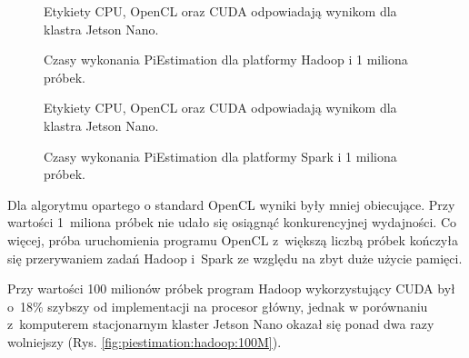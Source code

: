 \begin{figure}[h]
    \centering
    \caption{Czasy wykonania PiEstimation dla platformy Hadoop i 1 miliona próbek.}
    \medskip \small
    Etykiety CPU, OpenCL oraz CUDA odpowiadają wynikom dla klastra Jetson Nano.
    \label{fig:piestimation:hadoop:1M}
\end{figure}

\begin{figure}[h!]
    \centering
    \caption{Czasy wykonania PiEstimation dla platformy Spark i 1 miliona próbek.}
    \medskip \small
    Etykiety CPU, OpenCL oraz CUDA odpowiadają wynikom dla klastra Jetson Nano.
    \label{fig:piestimation:spark:1M}
\end{figure}

Dla algorytmu opartego o standard OpenCL wyniki były mniej obiecujące. Przy wartości 1~miliona próbek
nie udało się osiągnąć konkurencyjnej wydajności. Co więcej, próba uruchomienia programu OpenCL z~większą
liczbą próbek kończyła się przerywaniem zadań Hadoop i~Spark ze względu na zbyt duże użycie pamięci.
\newpage

Przy wartości 100 milionów próbek program Hadoop wykorzystujący CUDA był o~18\% szybszy od implementacji
na procesor główny, jednak w porównaniu z~komputerem stacjonarnym klaster Jetson Nano okazał się ponad
dwa razy wolniejszy (Rys. \ref{fig:piestimation:hadoop:100M}).

